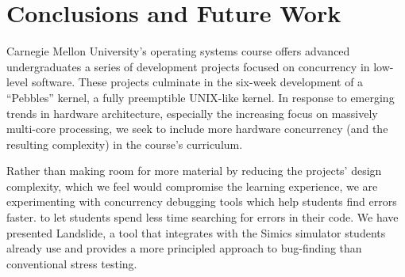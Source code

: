\section{Conclusions and Future Work}
\label{sec:future}

Carnegie Mellon University's operating systems course offers
advanced undergraduates
a series of
development projects focused on concurrency in low-level software.
These projects culminate in the six-week development of a ``Pebbles'' kernel, a fully preemptible UNIX-like kernel.
In response to emerging trends in hardware architecture, especially the increasing focus on massively multi-core processing, we seek to include more hardware concurrency (and the resulting complexity) in the course's curriculum.



Rather than making room for more material by reducing the projects' design complexity, which we feel would compromise the learning experience, we are experimenting with concurrency debugging tools
\shortversion
{which help students find errors faster.}
{to let students spend less time searching for errors in their code.}
We have presented Landslide, a tool that integrates with the Simics simulator students already use and provides a more principled approach to bug-finding than conventional stress testing.

